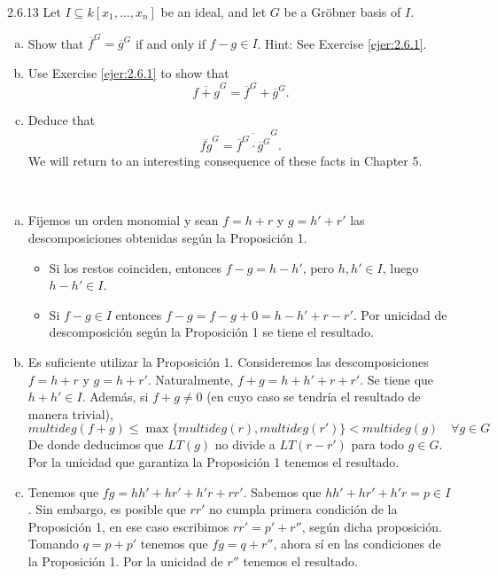 \documentclass[twoside]{article}
\begin{document}
\begin{ejercicio}{2.6.13}
Let $I ⊆ k[x_1,\dots , x_n]$ be an ideal, and let $G$ be a Gröbner basis of $I$.
\begin{enumerate}[a.]
\item Show that $\overline{f}^G = \overline{g}^G$ if and only if $f − g ∈ I$. Hint: See Exercise \ref{ejer:2.6.1}.
\item Use Exercise \ref{ejer:2.6.1} to show that
$$\overline{f + g}^G = \overline{f}^G + \overline{g}^G.$$
\item Deduce that
$$\overline{fg}^G = \overline{\overline{f}^G \cdot  \overline{g}^G}^G
.$$
We will return to an interesting consequence of these facts in Chapter 5.
\end{enumerate}
\end{ejercicio}
\begin{solucion}\
\begin{enumerate}[a.]
\item Fijemos un orden monomial y sean $f=h+r$ y $g=h'+r'$ las descomposiciones obtenidas según la Proposición 1. 
\begin{itemize}
\item Si los restos coinciden, entonces $f-g=h-h'$, pero $h,h'\in I$, luego $h-h'\in I$. 
\item Si $f-g\in I$ entonces $f-g=f-g+0 = h-h' + r-r'$. Por unicidad de descomposición según la Proposición 1 se tiene el resultado.
\end{itemize} 
\item Es suficiente utilizar la Proposición 1. Consideremos las descomposiciones $f=h+r$ y $g=h+r'$. Naturalmente, $f+g=h+h'+r+r'$. Se tiene que $h+h'\in I$. Además, si $f+g\neq 0$ (en cuyo caso se tendría el resultado de manera trivial), 
$$
multideg(f+g)\leq \max\{multideg(r),multideg(r')\}<multideg(g) \quad \forall g \in G
$$
De donde deducimos que $LT(g)$ no divide a $LT(r-r')$ para todo $g\in G$. Por la unicidad que garantiza la Proposición 1 tenemos el resultado.
\item Tenemos que $fg = hh'+hr'+h'r+rr'$. Sabemos que $hh'+hr'+h'r = p \in I$. Sin embargo, es posible que $rr'$ no cumpla primera condición de la Proposición 1, en ese caso escribimos $rr'=p'+r''$, según dicha proposición. Tomando $q=p+p'$ tenemos que $fg=q+r''$, ahora sí en las condiciones de la Proposición 1. Por la unicidad de $r''$ tenemos el resultado.
\end{enumerate}
\end{solucion}
\end{document}
